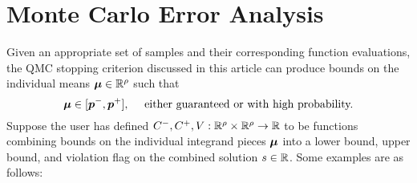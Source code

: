 \documentclass{article}[12pt]
\begin{document}
\section{Monte Carlo Error Analysis}


Given an appropriate set of  samples and their corresponding function evaluations, the QMC stopping criterion discussed in this article can produce bounds on the individual means $\boldsymbol{\mu} \in \mathbb{R}^\rho$ such that
\begin{equation}
    \boldsymbol{\mu} \in [\boldsymbol{p}^-,\boldsymbol{p}^+], \quad \text{ either guaranteed or with high probability.}
\end{equation}
Suppose the user has defined $C^-,C^+,V: \mathbb{R}^\rho \times \mathbb{R}^\rho \to \mathbb{R}$ to be functions combining bounds on the individual integrand pieces $\boldsymbol{\mu}$ into a lower bound, upper bound, and violation flag on the combined solution $s \in \mathbb{R}$. Some examples are as follows: 
\end{document}
